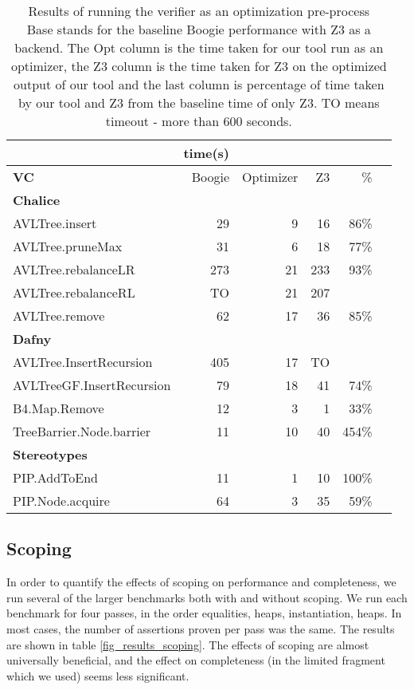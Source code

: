 \begin{table}
\centering
\scriptsize
\begin{tabular}{|l||r|r|r||r|r|}
\hline
                           &  \textbf{time(s)} &   & & \\
\hline
\textbf{VC}                &  Boogie & Optimizer & Z3 & \% \\

\hline
\textbf{Chalice} &&&&\\
\hline
 AVLTree.insert                 &  29 &   9 &  16 &  86\%\\
\hline
AVLTree.pruneMax               &  31 &   6 &  18 &  77\%\\
\hline
AVLTree.rebalanceLR            & 273 &  21 & 233 &  93\%\\
\hline
AVLTree.rebalanceRL            &  TO &  21 & 207 & \\
\hline
AVLTree.remove                 &  62 &  17 &  36 &  85\%\\
\hline
\textbf{Dafny} &&&&\\
\hline
AVLTree.InsertRecursion              & 405 &  17 &  TO &  \\
\hline
AVLTreeGF.InsertRecursion          &  79 &  18 &  41 &  74\%\\
\hline
B4.Map.Remove                                      &  12 &   3 &   1 &  33\%\\
\hline
TreeBarrier.Node.barrier                           &  11 &  10 &  40 & 454\%\\
\hline
\textbf{Stereotypes   } &&&&\\
\hline
PIP.AddToEnd                               &  11 &   1 &  10 & 100\%\\
\hline
PIP.Node.acquire                          &  64 &   3 &  35 &  59\%\\
\hline
\end{tabular}
\caption{Results of running the verifier as an optimization pre-process\\
Base stands for the baseline Boogie performance with Z3 as a backend. 
The Opt column is the time taken for our tool run as an optimizer, 
the Z3 column is the time taken for Z3 on the optimized output of our tool 
and the last column is percentage of time taken by our tool and Z3 from the baseline time of only Z3.
TO means timeout - more than 600 seconds.}
\label{fig_results_overall}
\end{table}


\subsection*{Scoping}
In order to quantify the effects of scoping on performance and completeness, we run several of the larger benchmarks both with and without scoping. We run each benchmark for four passes, in the order equalities, heaps, instantiation, heaps.
In most cases, the number of assertions proven per pass was the same.
The results are shown in table \ref{fig_results_scoping}. 
The effects of scoping are almost universally beneficial, and the effect on completeness (in the limited fragment which we used) seems less significant.


